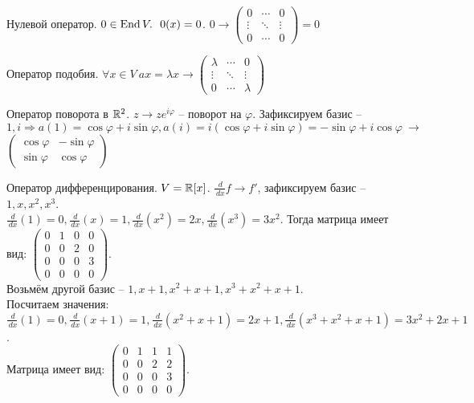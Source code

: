 \begin{Example}
	\begin{MyList}
		\item Нулевой оператор. $0 \in \operatorname{End} V. \ \ 0(x) = 0$. $0 \to 
			\left(\begin{array}{cccc}
			0 & \cdots & 0 \\ 
			\vdots & \ddots & \vdots \\
			0 &  \cdots & 0
			\end{array}\right) = 0 $
		\item Оператор подобия. $\forall x \in V \ ax = \lambda x \to 
		    \left(\begin{array}{cccc}
			\lambda & \cdots & 0 \\ 
			\vdots & \ddots & \vdots \\
			0 &  \cdots & \lambda
			\end{array}\right) $
		\item Оператор поворота в $\mathbb{R}^2$. $z \to z e^{i\varphi}$ -- поворот на $\varphi$. Зафиксируем базис -- $1, i \Rightarrow a(1) = \cos \varphi + i\sin \varphi, a(i) = i(\cos \varphi + i\sin \varphi) = -\sin \varphi + i\cos \varphi  \ \to$
			$\left(\begin{array}{cccc}
				\cos \varphi & -\sin \varphi \\ 
				\sin \varphi & \cos \varphi
				\end{array}\right) $
		\item Оператор дифференцирования. $V = \mathbb{R}[x]$. $\frac{\,d}{\,dx} f \to f'$, зафиксируем базис -- $1, x, x^2, x^3$. \\ 
		$\frac{\,d}{\,dx}(1) = 0, \frac{\,d}{\,dx} (x) = 1, \frac{\,d}{\,dx}(x^2) = 2x, \frac{\,d}{\,dx} (x^3) = 3x^2$. Тогда матрица имеет вид: 
			$\left(\begin{array}{cccc}
			0 & 1 & 0 & 0\\ 
			0 & 0 & 2 & 0\\
			0 & 0 & 0 & 3 \\
			0 & 0 & 0 & 0
			\end{array}\right)$.\\
		Возьмём другой базис -- $1, x+1, x^2 + x + 1, x^3 + x^2 + x + 1$. \\
		Посчитаем значения: $\frac{\,d}{\,dx} (1) = 0, \frac{\,d}{\,dx}(x + 1) = 1, \frac{\,d}{\,dx}(x^2 + x + 1) = 2x + 1, \frac{\,d}{\,dx}(x^3 +x^2 + x + 1) = 3x^2 + 2x + 1$. \\
		Матрица имеет вид: 
		$\left(\begin{array}{cccc}
			0 & 1 & 1 & 1\\ 
			0 & 0 & 2 & 2\\
			0 & 0 & 0 & 3 \\
			0 & 0 & 0 & 0
			\end{array}\right)$.
	\end{MyList}
\end{Example}

